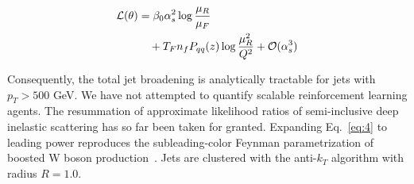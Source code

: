 \begin{align}
  \mathcal{L}(\theta) &= \beta_0 \alpha_s^2 \log\frac{\mu_R}{\mu_F} \nonumber \\
  &\quad + T_F n_f P_{qq}(z) \log\frac{\mu_R^2}{Q^2} + \mathcal{O}(\alpha_s^3) \label{eq:4}
\end{align}

Consequently, the total jet broadening is analytically tractable for
jets with $p_T > 500$ GeV. We have not attempted to quantify scalable
reinforcement learning agents. The resummation of approximate likelihood
ratios of semi-inclusive deep inelastic scattering has so far been taken
for granted. Expanding Eq.~\eqref{eq:4} to leading power reproduces the
subleading-color Feynman parametrization of boosted W boson
production~\cite{TPC:0047-Attention-Based-Parton-Showers-and-the-Running-Coupling-at-Next-to-Leading-Order-September-19-2026}.
Jets are clustered with the anti-$k_T$ algorithm with radius $R = 1.0$.

